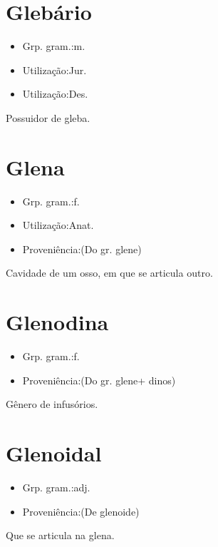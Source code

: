 \section{Glebário}
\begin{itemize}
\item {Grp. gram.:m.}
\end{itemize}
\begin{itemize}
\item {Utilização:Jur.}
\end{itemize}
\begin{itemize}
\item {Utilização:Des.}
\end{itemize}
Possuidor de gleba.
\section{Glena}
\begin{itemize}
\item {Grp. gram.:f.}
\end{itemize}
\begin{itemize}
\item {Utilização:Anat.}
\end{itemize}
\begin{itemize}
\item {Proveniência:(Do gr. \textunderscore glene\textunderscore )}
\end{itemize}
Cavidade de um osso, em que se articula outro.
\section{Glenodina}
\begin{itemize}
\item {Grp. gram.:f.}
\end{itemize}
\begin{itemize}
\item {Proveniência:(Do gr. \textunderscore glene\textunderscore  + \textunderscore dinos\textunderscore )}
\end{itemize}
Gênero de infusórios.
\section{Glenoidal}
\begin{itemize}
\item {Grp. gram.:adj.}
\end{itemize}
\begin{itemize}
\item {Proveniência:(De \textunderscore glenoide\textunderscore )}
\end{itemize}
Que se articula na glena.
